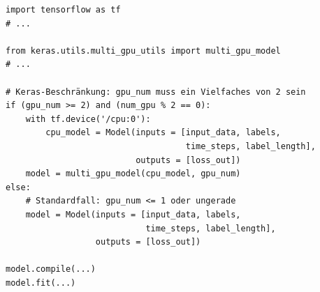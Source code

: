 \begin{code}
\begin{verbatim}
import tensorflow as tf
# ...

from keras.utils.multi_gpu_utils import multi_gpu_model
# ...

# Keras-Beschränkung: gpu_num muss ein Vielfaches von 2 sein
if (gpu_num >= 2) and (num_gpu % 2 == 0):
    with tf.device('/cpu:0'):
        cpu_model = Model(inputs = [input_data, labels,
                                    time_steps, label_length],
                          outputs = [loss_out])
    model = multi_gpu_model(cpu_model, gpu_num)
else:
    # Standardfall: gpu_num <= 1 oder ungerade
    model = Model(inputs = [input_data, labels,
                            time_steps, label_length],
                  outputs = [loss_out])

model.compile(...)
model.fit(...)
\end{verbatim}
\label{daten:taurus:multigpu:source}
\end{code}
